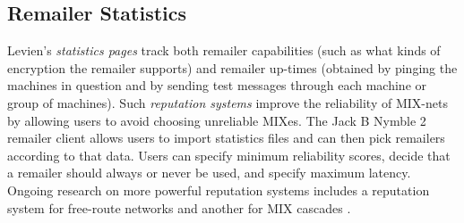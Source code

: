 \documentclass{llncs}
\begin{document}


%
%

\subsection{Remailer Statistics}

Levien's \emph{statistics pages} \cite{levien} track both remailer
capabilities (such as what kinds of encryption the remailer supports)
and remailer up-times (obtained by pinging the machines in question
and by sending test messages through each machine or group of machines).
Such \emph{reputation systems} improve the reliability of MIX-nets by
allowing users to avoid choosing unreliable MIXes. The Jack B Nymble 2
remailer client \cite{potato} allows users to import statistics files
and can then pick remailers according to that data. Users can specify
minimum reliability scores, decide that a remailer should always or never
be used, and specify maximum latency. Ongoing research on more powerful
reputation systems includes a reputation system for free-route networks
\cite{mix-acc} and another for MIX cascades \cite{casc-rep}.
\end{document}
